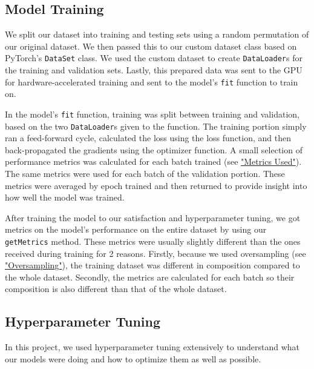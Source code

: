 \documentclass{article}
\begin{document}
\subsection{Model Training}

We split our dataset into training and testing sets using a random permutation of our original dataset. We then passed this to our custom 
dataset class based on PyTorch's \verb|DataSet| class. We used the custom dataset to create \verb|DataLoader|s for the training and validation sets. 
Lastly, this prepared data was sent to the GPU for hardware-accelerated training and sent to the model's \verb|fit| function to train on. 

In the model's \verb|fit| function, training was split between training and validation, based on the two \verb|DataLoader|s given to the
function. The training portion simply ran a feed-forward cycle, calculated the loss using the loss function, and then back-propagated the
gradients using the optimizer function. A small selection of performance metrics was calculated for each batch trained (see 
\hyperref[sssec:metrics]{"Metrics Used"}). The same metrics were used for each batch of the validation portion. These metrics were 
averaged by epoch trained and then returned to provide insight into how well the model was trained.  

After training the model to our satisfaction and hyperparameter tuning, we got metrics on the model's performance on the entire dataset
by using our \verb|getMetrics| method. These metrics were usually slightly different than the ones received during training for 2 reasons.
Firstly, because we used oversampling (see \hyperref[sssec:ovrsmpl]{"Oversampling"}), the training dataset was different in composition 
compared to the whole dataset. Secondly, the metrics are calculated for each batch so their composition is also different than that of the 
whole dataset.

\subsection{Hyperparameter Tuning}

In this project, we used hyperparameter tuning extensively to understand what our models were doing and how to optimize 
them as well as possible.
\end{document}
